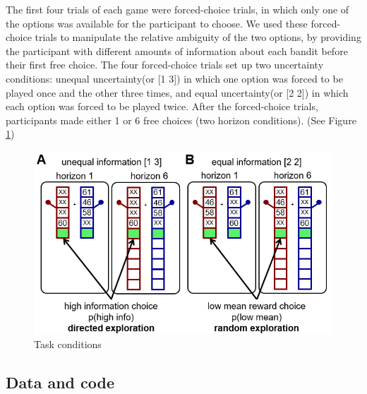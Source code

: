 \documentclass[12pt]{article}
\begin{document}
	The first four trials of each game were forced-choice trials, in which only one of the options was available for the participant to choose. We used these forced-choice trials to manipulate the relative ambiguity of the two options, by providing the participant with different amounts of information about each bandit before their first free choice. The four forced-choice trials set up two uncertainty conditions: unequal uncertainty(or [1 3]) in which one option was forced to be played once and the other three times, and equal uncertainty(or [2 2]) in which each option was forced to be played twice. After the forced-choice trials, participants made either 1 or 6 free choices (two horizon conditions). (See Figure \ref{fig:taskfig2})	 
	
	\begin{figure}[H]
		\begin{center}
			\includegraphics[width=\textwidth]{figures/taskfig2.PNG}
			\caption{Task conditions}
			\label{fig:taskfig2}
		\end{center}
	\end{figure}
	
	
	\subsection*{Data and code}
	
\end{document}
